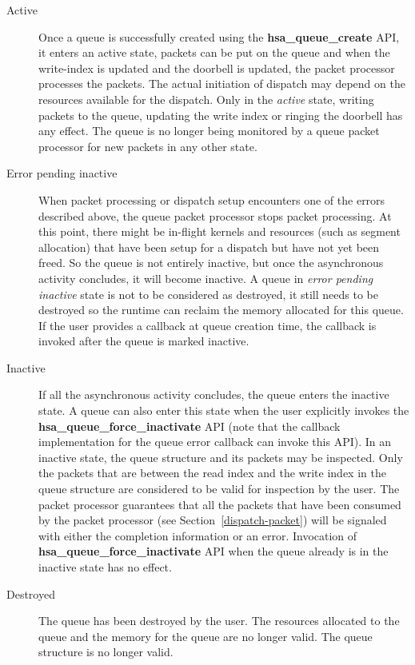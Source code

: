\documentclass[draft]{book}
\newcommand{\reffun}[1]{\textbf{#1}}
\begin{document}
\begin{description}
\item[Active] Once a queue is successfully created using the
  \reffun{hsa_queue_create} API, it enters an active state, packets can be put
  on the queue and when the write-index is updated and the doorbell is updated,
  the packet processor processes the packets. The actual initiation of dispatch
  may depend on the resources available for the dispatch. Only in the
  \emph{active} state, writing packets to the queue, updating the write index or
  ringing the doorbell has any effect. The queue is no longer being monitored by
  a queue packet processor for new packets in any other state.

\item[Error pending inactive] When packet processing or dispatch setup
  encounters one of the errors described above, the queue packet processor stops
  packet processing. At this point, there might be in-flight kernels and
  resources (such as segment allocation) that have been setup for a dispatch but
  have not yet been freed. So the queue is not entirely inactive, but once the
  asynchronous activity concludes, it will become inactive. A queue in
  \emph{error pending inactive} state is not to be considered as destroyed, it
  still needs to be destroyed so the runtime can reclaim the memory allocated
  for this queue. If the user provides a callback at queue creation time, the
  callback is invoked after the queue is marked inactive.

\item[Inactive] If all the asynchronous activity concludes, the queue enters the
  inactive state. A queue can also enter this state when the user explicitly
  invokes the \reffun{hsa_queue_force_inactivate} API (note that the callback
  implementation for the queue error callback can invoke this API). In an
  inactive state, the queue structure and its packets may be inspected. Only the
  packets that are between the read index and the write index in the queue
  structure are considered to be valid for inspection by the user. The packet
  processor guarantees that all the packets that have been consumed by the
  packet processor (see Section~\ref{dispatch-packet}) will be signaled with
  either the completion information or an error. Invocation of
  \reffun{hsa_queue_force_inactivate} API when the queue already is in the
  inactive state has no effect.

\item[Destroyed] The queue has been destroyed by the user. The resources
  allocated to the queue and the memory for the queue are no longer valid. The
  queue structure is no longer valid.
\end{description}
\end{document}
